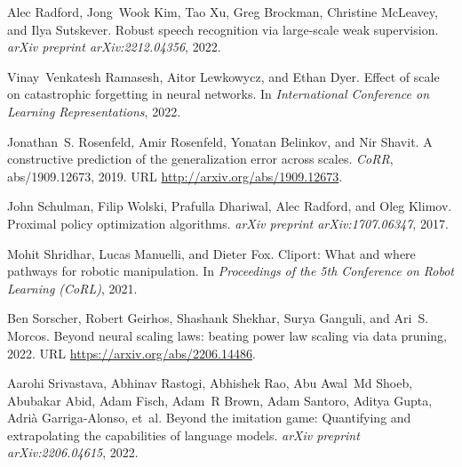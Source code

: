 \documentclass{article} %
\begin{document}
\begin{thebibliography}{44}
Alec Radford, Jong~Wook Kim, Tao Xu, Greg Brockman, Christine McLeavey, and
  Ilya Sutskever.
\newblock Robust speech recognition via large-scale weak supervision.
\newblock \emph{arXiv preprint arXiv:2212.04356}, 2022.

Vinay~Venkatesh Ramasesh, Aitor Lewkowycz, and Ethan Dyer.
\newblock Effect of scale on catastrophic forgetting in neural networks.
\newblock In \emph{International Conference on Learning Representations}, 2022.

Jonathan~S. Rosenfeld, Amir Rosenfeld, Yonatan Belinkov, and Nir Shavit.
\newblock A constructive prediction of the generalization error across scales.
\newblock \emph{CoRR}, abs/1909.12673, 2019.
\newblock URL \url{http://arxiv.org/abs/1909.12673}.

John Schulman, Filip Wolski, Prafulla Dhariwal, Alec Radford, and Oleg Klimov.
\newblock Proximal policy optimization algorithms.
\newblock \emph{arXiv preprint arXiv:1707.06347}, 2017.

Mohit Shridhar, Lucas Manuelli, and Dieter Fox.
\newblock Cliport: What and where pathways for robotic manipulation.
\newblock In \emph{Proceedings of the 5th Conference on Robot Learning (CoRL)},
  2021.

Ben Sorscher, Robert Geirhos, Shashank Shekhar, Surya Ganguli, and Ari~S.
  Morcos.
\newblock Beyond neural scaling laws: beating power law scaling via data
  pruning, 2022.
\newblock URL \url{https://arxiv.org/abs/2206.14486}.

Aarohi Srivastava, Abhinav Rastogi, Abhishek Rao, Abu Awal~Md Shoeb, Abubakar
  Abid, Adam Fisch, Adam~R Brown, Adam Santoro, Aditya Gupta, Adri{\`a}
  Garriga-Alonso, et~al.
\newblock Beyond the imitation game: Quantifying and extrapolating the
  capabilities of language models.
\newblock \emph{arXiv preprint arXiv:2206.04615}, 2022.


\end{thebibliography}
\end{document}
